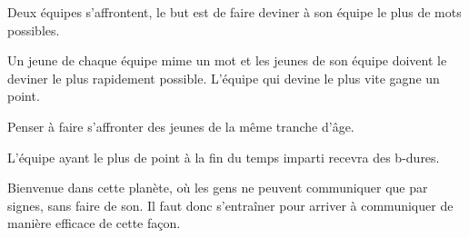 \documentclass{grand-jeu}
\begin{document}
\begin{liste-materiel}
\end{liste-materiel}

\begin{regles}
Deux équipes s'affrontent, le but est de faire deviner à son équipe le plus de mots possibles. 

Un jeune de chaque équipe mime un mot et les jeunes de son équipe doivent le deviner le plus rapidement possible. L'équipe qui devine le plus vite gagne un point. 

Penser à faire s'affronter des jeunes de la même tranche d'âge. 

L’équipe ayant le plus de point à la fin du temps imparti recevra des b-dures.
\end{regles}

\begin{imaginaire}
Bienvenue dans cette planète, où les gens ne peuvent communiquer que par signes, sans faire de son. Il faut donc s'entraîner pour arriver à communiquer de manière efficace de cette façon.

\end{imaginaire}

\begin{moments-stop}
\end{moments-stop}
\end{document}
